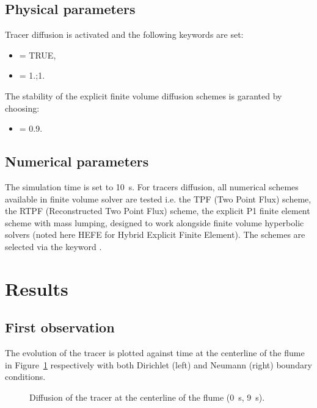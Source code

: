 \subsection{Physical parameters}

Tracer diffusion is activated and the following keywords are set:
\begin{itemize}
\item{} = TRUE,
\item{} = 1.;1.
\end{itemize}
The stability of the explicit finite volume diffusion schemes is garanted by
choosing:
\begin{itemize}
\item{} = 0.9.
\end{itemize}

\subsection{Numerical parameters}

The simulation time is set to 10~s.
For tracers diffusion, all numerical schemes available in  finite
volume solver are tested
i.e. the TPF (Two Point Flux) scheme, the RTPF (Reconstructed Two Point Flux)
scheme, 
the explicit P1 
finite element scheme with mass lumping, designed to work alongside finite
volume hyperbolic solvers (noted here HEFE for Hybrid Explicit Finite Element).
The schemes are selected via the keyword
.

\section{Results}

\subsection{First observation}

The evolution of the tracer is plotted against time at the centerline of the
flume
in Figure~\ref{fig:tracerdiffusion:T}
respectively with both Dirichlet (left) and Neumann (right) boundary conditions.

\begin{figure}[h!]
 \centering
 \caption{Diffusion of the tracer at the centerline of the flume (0~s, 9~s).}
 \label{fig:tracerdiffusion:T}
\end{figure}

